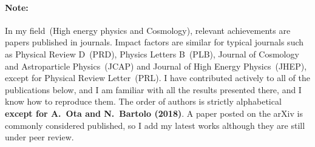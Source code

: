 \documentclass[a4paper]{resume} %
\begin{document}
\paragraph{Note:}
In my field~(High energy physics and Cosmology), relevant achievements are papers published in journals. 
Impact factors are similar for typical journals such as Physical Review D~(PRD), Physics Letters B~(PLB), Journal of Cosmology and Astroparticle Physics~(JCAP) and Journal of High Energy Physics~(JHEP), except for Physical Review Letter~(PRL). 
I have contributed actively to all of the publications below, and I am familiar with all the results presented there, and I know how to reproduce them.
The order of authors is strictly alphabetical {\bf except for {\bf A.~Ota} and N.~Bartolo (2018)}. 
A paper posted on the arXiv is commonly considered published, so I add my latest works %
although they are still under peer review.
\end{document}

